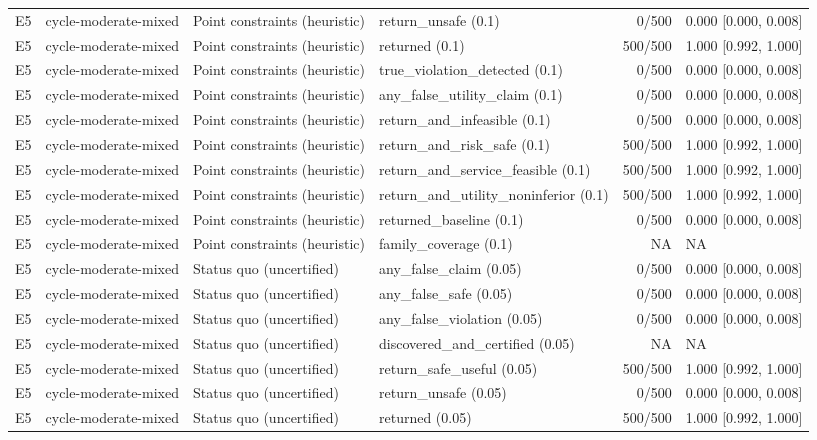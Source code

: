 \begin{longtable}{p{.04\linewidth}p{.18\linewidth}p{.19\linewidth}p{.16\linewidth}r p{.21\linewidth}}
E5 & cycle-moderate-mixed & Point constraints (heuristic) & return\_unsafe (0.1) & 0/500 & 0.000 [0.000, 0.008]\\
E5 & cycle-moderate-mixed & Point constraints (heuristic) & returned (0.1) & 500/500 & 1.000 [0.992, 1.000]\\
E5 & cycle-moderate-mixed & Point constraints (heuristic) & true\_violation\_detected (0.1) & 0/500 & 0.000 [0.000, 0.008]\\
E5 & cycle-moderate-mixed & Point constraints (heuristic) & any\_false\_utility\_claim (0.1) & 0/500 & 0.000 [0.000, 0.008]\\
E5 & cycle-moderate-mixed & Point constraints (heuristic) & return\_and\_infeasible (0.1) & 0/500 & 0.000 [0.000, 0.008]\\
E5 & cycle-moderate-mixed & Point constraints (heuristic) & return\_and\_risk\_safe (0.1) & 500/500 & 1.000 [0.992, 1.000]\\
E5 & cycle-moderate-mixed & Point constraints (heuristic) & return\_and\_service\_feasible (0.1) & 500/500 & 1.000 [0.992, 1.000]\\
E5 & cycle-moderate-mixed & Point constraints (heuristic) & return\_and\_utility\_noninferior (0.1) & 500/500 & 1.000 [0.992, 1.000]\\
E5 & cycle-moderate-mixed & Point constraints (heuristic) & returned\_baseline (0.1) & 0/500 & 0.000 [0.000, 0.008]\\
E5 & cycle-moderate-mixed & Point constraints (heuristic) & family\_coverage (0.1) & NA & NA\\
E5 & cycle-moderate-mixed & Status quo (uncertified) & any\_false\_claim (0.05) & 0/500 & 0.000 [0.000, 0.008]\\
E5 & cycle-moderate-mixed & Status quo (uncertified) & any\_false\_safe (0.05) & 0/500 & 0.000 [0.000, 0.008]\\
E5 & cycle-moderate-mixed & Status quo (uncertified) & any\_false\_violation (0.05) & 0/500 & 0.000 [0.000, 0.008]\\
E5 & cycle-moderate-mixed & Status quo (uncertified) & discovered\_and\_certified (0.05) & NA & NA\\
E5 & cycle-moderate-mixed & Status quo (uncertified) & return\_safe\_useful (0.05) & 500/500 & 1.000 [0.992, 1.000]\\
E5 & cycle-moderate-mixed & Status quo (uncertified) & return\_unsafe (0.05) & 0/500 & 0.000 [0.000, 0.008]\\
E5 & cycle-moderate-mixed & Status quo (uncertified) & returned (0.05) & 500/500 & 1.000 [0.992, 1.000]\\

\end{longtable}
